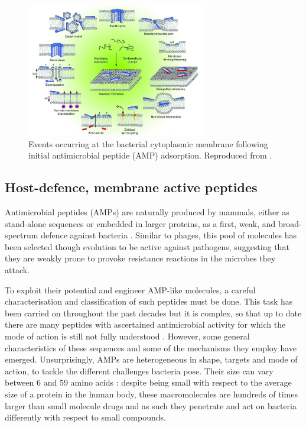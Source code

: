\begin{figure}
\begin{center}
\includegraphics[width = 0.7\textwidth]{pics/amp_mech.jpg}
\caption[Antimicrobial peptides]{Events occurring at the bacterial cytoplasmic membrane following initial antimicrobial peptide (AMP) adsorption. Reproduced from \cite{Nguyen2011}.} \label{fig:amp}
\end{center}
\end{figure}


\subsection{Host-defence, membrane active peptides} \label{sec:host-defense-peptides}
Antimicrobial peptides (AMPs) are naturally produced by mammals, either as stand-alone sequences or embedded in larger proteins, as a first, weak, and broad-spectrum defence against bacteria \cite{Nguyen2011,Bahar2013,Mahlapuu2016,Zhang2016}.
%
Similar to phages, this pool of molecules has been selected though evolution to be active against pathogens, suggesting that they are weakly prone to provoke resistance reactions in the microbes they attack.

To exploit their potential and engineer AMP-like molecules, a careful characterisation and classification of such peptides must be done. This task has been carried on throughout the past decades but it is complex, so that up to date there are many peptides with ascertained antimicrobial activity for which the mode of action is still not fully understood \cite{Ebbensgaard2015}. However, some general characteristics of these sequences and some of the mechanisms they employ have emerged.
%
Unsurprisingly, AMPs are heterogeneous in shape, targets and mode of action, to tackle the different challenges bacteria pose. Their size can vary between 6 and 59 amino acids \cite{Brogden2005}: despite being small with respect to the average size of a protein in the human body, these macromolecules are hundreds of times larger than small molecule drugs and as such they penetrate and act on bacteria differently with respect to small compounds.

